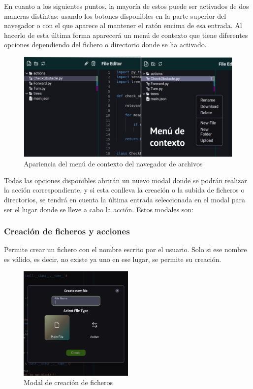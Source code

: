 En cuanto a los siguientes puntos, la mayoría de estos puede ser activados de dos maneras distintas: usando los botones disponibles en la parte superior del navegador o con el que aparece al mantener el ratón encima de esa entrada. Al hacerlo de esta última forma aparecerá un menú de contexto que tiene diferentes opciones dependiendo del fichero o directorio donde se ha activado.

\begin{figure}[H]
    \centering
    \includegraphics[width=\textwidth]{figures/bt-avances/bt-nav-2.png}
    \caption{Apariencia del menú de contexto del navegador de archivos}
    \label{fig:nav-menu}
\end{figure}

Todas las opciones disponibles abrirán un nuevo modal donde se podrán realizar la acción correspondiente, y si esta conlleva la creación o la subida de ficheros o directorios, se tendrá en cuenta la última entrada seleccionada en el modal para ser el lugar donde se lleve a cabo la acción. Estos modales son:

\subsubsection{Creación de ficheros y acciones}

Permite crear un fichero con el nombre escrito por el usuario. Solo si ese nombre es válido, es decir, no existe ya uno en ese lugar, se permite su creación.

\begin{figure}[H]
    \centering
    \includegraphics[width=0.5\textwidth]{figures/bt-avances/new-file.png}
    \caption{Modal de creación de ficheros}
    \label{fig:bt-file-new}
\end{figure}

